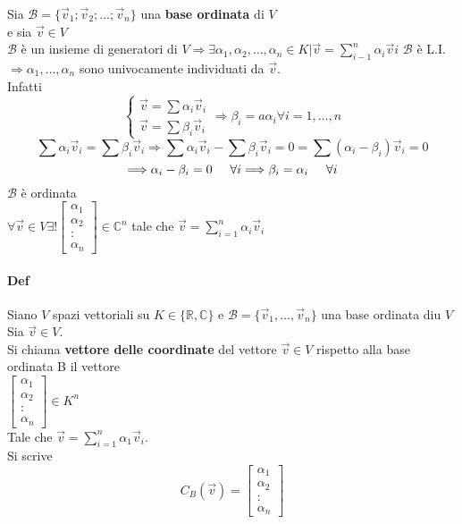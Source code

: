 Sia $\mathcal{B}=\{\vec{v}_1;\vec{v}_2;\dots;\vec{v}_n\}$ una \textbf{base ordinata} di $V$\\
e sia $\vec{v}\in V$\\
$\mathcal{B}$ è un insieme di generatori di 
$V\Longrightarrow \exists\alpha_1,\alpha_2,\dots,\alpha_n\in K\Big|\vec{v}
=\sum_{i-1}^{n}\alpha_i\vec{v}i$
$\mathcal{B}$ è L.I. \\
$\Longrightarrow \alpha_1, \dots, \alpha_n$ sono univocamente individuati da $\vec{v}$.\\
Infatti
\[
    \begin{cases}
        \vec{v}=\sum \alpha_i\vec{v}_i\\
        \vec{v}=\sum \beta_i\vec{v}_i
    \end{cases}
    \Longrightarrow\beta_i=a\alpha_i \forall i=1, \dots, n
\]
\[
    \sum\alpha_i\vec{v}_i=\sum\beta_i\vec{v}_i\Longrightarrow
    \sum\alpha_i\vec{v}_i-\sum\beta_i\vec{v}_i=0=\sum(\alpha_i-\beta_i)\vec{v}_i=0
\]
\[
    \Longrightarrow\alpha_i-\beta_i=0\hspace{0.5cm} \forall i\Longrightarrow\beta_i=\alpha_i 
    \hspace{0.5cm}\forall i
\]
$\mathcal{B}$ è ordinata \\
{\Large
    $\forall \vec{v}\in V \exists!
    \begin{bmatrix}
        \alpha_1\\
        \alpha_2\\
        :\\
        \alpha_n
    \end{bmatrix}
    \in\mathbb{C}^n $
tale che 
$\vec{v}=\sum_{i=1}^{n}\alpha_i\vec{v}_i$
}

\paragraph{Def}
Siano $V$ spazi vettoriali su $K \in\{\mathbb{R}, \mathbb{C}\}$ e $\mathcal{B}=\{\vec{v}_1, \dots, \vec{v}_n\}$ una base ordinata diu $V$\\
Sia $\vec{v}\in V$.\\
Si chiama \textbf{vettore delle coordinate} del vettore $\vec{v}\in V$ 
rispetto alla base ordinata B il vettore \\

$\begin{bmatrix}
    \alpha_1\\
    \alpha_2\\
    :\\
    \alpha_n
\end{bmatrix}\in K^n$\\
Tale che $\vec{v}=\sum_{i=1}^{n} \alpha_1\vec{v}_i$.\\
Si scrive
\[
    C_B(\vec{v})= 
    \begin{bmatrix}
        \alpha_1\\
        \alpha_2\\
        :\\
        \alpha_n
    \end{bmatrix}
\]

